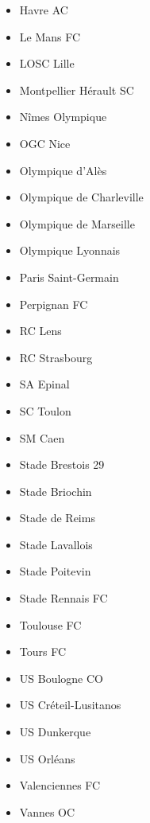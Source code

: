 \begin{multicols}{2}
\begin{itemize}
		\item Havre AC
		\item Le Mans FC
		\item LOSC Lille
		\item Montpellier Hérault SC
		\item Nîmes Olympique
		\item OGC Nice
		\item Olympique d'Alès
		\item Olympique de Charleville
		\item Olympique de Marseille
		\item Olympique Lyonnais
		\item Paris Saint-Germain
		\item Perpignan FC
		\item RC Lens
		\item RC Strasbourg
		\item SA Epinal
		\item SC Toulon
		\item SM Caen
		\item Stade Brestois 29
		\item Stade Briochin
		\item Stade de Reims
		\item Stade Lavallois
		\item Stade Poitevin
		\item Stade Rennais FC
		\item Toulouse FC
		\item Tours FC
		\item US Boulogne CO
		\item US Créteil-Lusitanos
		\item US Dunkerque
		\item US Orléans
		\item Valenciennes FC
		\item Vannes OC
	\end{itemize}
\end{multicols}

